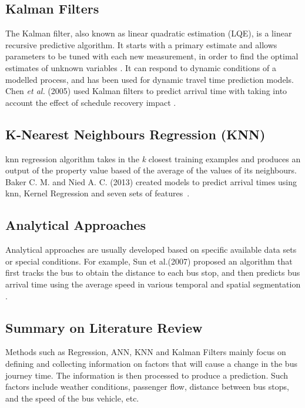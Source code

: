 \subsection{Kalman Filters}
\par The Kalman filter, also known as linear quadratic estimation (LQE), is a linear recursive predictive algorithm. It starts with a primary estimate and allows parameters to be tuned with each new measurement, in order to find the optimal estimates of unknown variables \cite{kalman_filters}. It can respond to dynamic conditions of a modelled process, and has been used for dynamic travel time prediction models. Chen \textit{et al.} (2005) used Kalman filters to predict arrival time with taking into account the effect of schedule recovery impact \cite{kalman_dynamic_schedule}.

\subsection{K-Nearest Neighbours Regression (KNN)}
\par \acrfull{knn} regression algorithm takes in the \textit{k} closest training examples and produces an output of the property value based of the average of the values of its neighbours. Baker C. M. and Nied A. C. (2013) created models to predict arrival times using \acrshort{knn}, Kernel Regression and seven sets of features~\cite{knn_one_bus_away}.

\subsection{Analytical Approaches}
\par Analytical approaches are usually developed based on specific available data sets or special conditions. For example, Sun et al.(2007) proposed an algorithm that first tracks the bus to obtain the distance to each bus stop, and then predicts bus arrival time using the average speed in various temporal and spatial segmentation \cite{analytical_approach}.

\subsection{Summary on Literature Review}
\par Methods such as Regression, ANN, KNN and Kalman Filters mainly focus on defining and collecting information on factors that will cause a change in the bus journey time. The information is then processed to produce a prediction. Such factors include weather conditions, passenger flow, distance between bus stops, and the speed of the bus vehicle, etc.

